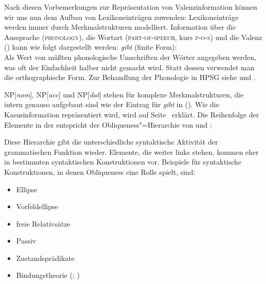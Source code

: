 Nach diesen Vorbemerkungen zur Repräsentation von Valenzinformation können wir uns nun
dem Aufbau von Lexikoneinträgen zuwenden: Lexikoneinträge werden immer durch Merkmalstrukturen modelliert. Information über die
Aussprache (\textsc{phonology}), die Wortart (\textsc{part-of-speech}, kurs \textsc{p-o-s}) und die Valenz
(\subcat) kann wie folgt dargestellt werden:
\ea
\label{le-gibt-1}
\textit{gibt\/} (finite Form):\\
\z
Als Wert von \phon müßten phonologische Umschriften der Wörter angegeben werden,
was oft der Einfachheit halber nicht gemacht wird.
Statt dessen verwendet man die orthographische Form. Zur Behandlung der Phonologie in HPSG siehe
 und .

NP[\textit{nom\/}], NP[\textit{acc}] und NP[\textit{dat}] stehen für komplexe Merkmalstrukturen, die intern
genauso aufgebaut sind wie der Eintrag für \emph{gibt} in (). Wie die Kasusinformation
repräsentiert wird, wird auf Seite~\pageref{page-ref-case-feat} erklärt.
%
Die Reihenfolge der Elemente in der \subcatl entspricht der Obliqueness"=Hierarchie
von \citet{KC77a} und \citet{Pullum77a}:
\begin{table}[H]
\label{page-obliquen-h}
\end{table}
\noindent
Diese Hierarchie gibt die unterschiedliche syntaktische Aktivität der grammatischen Funktion wieder.
Elemente, die weiter links stehen, kommen eher in bestimmten syntaktischen Konstruktionen vor. Beispiele
für syntaktische Konstruktionen, in denen Obliqueness eine Rolle spielt, sind:
\begin{itemize}
\item Ellipse \citep{Klein85}
\item Vorfeldellipse \citep{Fries88b}
\item freie Relativsätze
      \citep{Bausewein90,Pittner95b,Mueller99b}
\item Passiv \citep{KC77a}
\item Zustandsprädikate \citep{Mueller2001c,Mueller2002b,Mueller2008a}
\item Bindungstheorie (\citealp{Grewendorf85a}; \citealp{PS92a,ps2})
\end{itemize}

